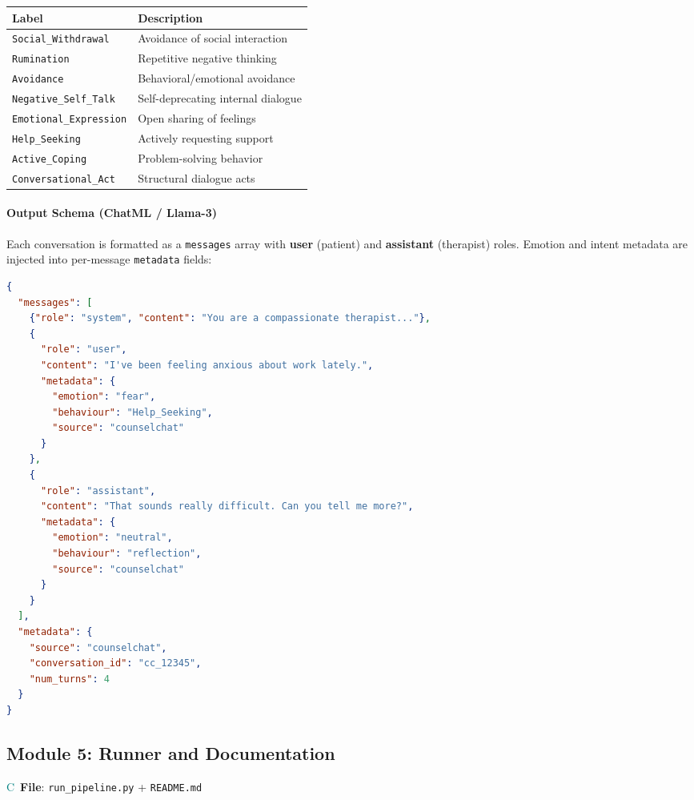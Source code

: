 \documentclass[11pt,a4paper]{article}
\begin{document}
\begin{center}
\begin{tabular}{>{\ttfamily}p{3.5cm}p{8cm}}
\toprule
\textbf{Label} & \textbf{Description} \\
\midrule
\texttt{Social\_Withdrawal} & Avoidance of social interaction \\
\texttt{Rumination} & Repetitive negative thinking \\
\texttt{Avoidance} & Behavioral/emotional avoidance \\
\texttt{Negative\_Self\_Talk} & Self-deprecating internal dialogue \\
\texttt{Emotional\_Expression} & Open sharing of feelings \\
\texttt{Help\_Seeking} & Actively requesting support \\
\texttt{Active\_Coping} & Problem-solving behavior \\
\texttt{Conversational\_Act} & Structural dialogue acts \\
\bottomrule
\end{tabular}
\end{center}

\paragraph{Output Schema (ChatML / Llama-3)}

Each conversation is formatted as a \texttt{messages} array with \textbf{user} (patient) and \textbf{assistant} (therapist) roles. Emotion and intent metadata are injected into per-message \texttt{metadata} fields:

\begin{lstlisting}[language=json, caption=Example output record (JSONL)]
{
  "messages": [
    {"role": "system", "content": "You are a compassionate therapist..."},
    {
      "role": "user",
      "content": "I've been feeling anxious about work lately.",
      "metadata": {
        "emotion": "fear",
        "behaviour": "Help_Seeking",
        "source": "counselchat"
      }
    },
    {
      "role": "assistant",
      "content": "That sounds really difficult. Can you tell me more?",
      "metadata": {
        "emotion": "neutral",
        "behaviour": "reflection",
        "source": "counselchat"
      }
    }
  ],
  "metadata": {
    "source": "counselchat",
    "conversation_id": "cc_12345",
    "num_turns": 4
  }
}
\end{lstlisting}

\subsection{Module 5: Runner and Documentation}
\textcolor{teal}{\textsf{C}}\ \textbf{File}: \texttt{run\_pipeline.py} + \texttt{README.md}
\end{document}
